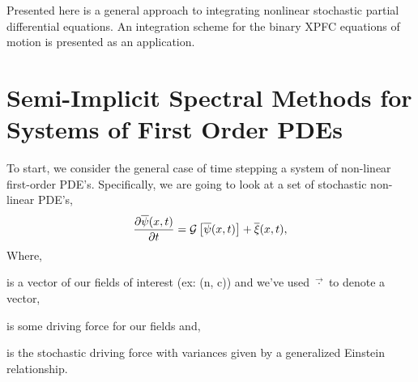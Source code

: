 \label{appendix:algorithm}

Presented here is a general approach to integrating nonlinear stochastic
partial differential equations. An integration scheme for the binary
XPFC equations of motion is presented as an application.

\section{Semi-Implicit Spectral Methods for Systems of First Order PDEs}  

To start, we consider the general case of time stepping  a system of non-linear
first-order PDE's. Specifically, we are going to look at a set of stochastic
non-linear PDE's,
%
\begin{equation}
	\frac{\partial \overline{\psi}(x, t)}{\partial t} = 
       \mathcal{G}\left[ \overline{\psi}(x, t) \right] + \overline{\xi}(x, t),
\end{equation} 
%
Where,
\begin{description}[align=right, labelwidth=1cm]
    \item[$\vec{\psi}(x, t)$] {is a vector of our fields of interest (ex: (n, c))
        and we've used $\vec{\cdot}$ to denote a vector,
    }
    \item[$\mathcal{G}$] is some driving force for our fields and,
    \item[$\vec{\xi}(x, t)$] { is the stochastic driving force with 
        variances given by a generalized Einstein relationship.
    }
\end{description}

